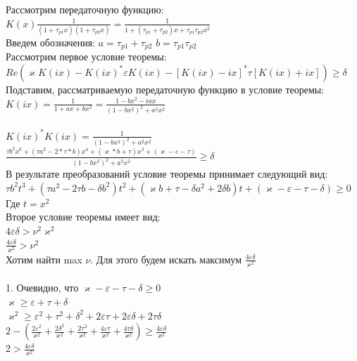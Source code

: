 \documentclass[a4paper]{article}
\begin{document}

 Рассмотрим передаточную функцию:
$K(x)\frac{1}{(1+\tau_{p1}x)(1+\tau_{p2}x)} = \frac{1}{1+(\tau_{p1}+\tau_{p2})x + \tau_{p1}\tau_{p2}x^2}$\\
Введем обозначения:
$a = \tau_{p1}+\tau_{p2}$
$b = \tau_{p1}\tau_{p2}$\\
Рассмотрим первое условие теоремы:\\
$Re(\varkappa K(ix)-K(ix)^*\varepsilon K(ix)-[K(ix)-ix]^*\tau[K(ix)+ix])\geq\delta$\\
Подставим, рассматриваемую передаточную функцию в условие теоремы:\\
$K(ix)=\frac{1}{1+ax + bx^2}=\frac{1-bx^2-iax}{(1-bx^2)^2 + a^2x^2}$\\\\
$K(ix)^*K(ix)=\frac{1}{(1-bx^2)^2 + a^2x^2}$\\
$\frac{\tau b^2x^6 + (\tau a^2-2*\tau*b)x^4 + (\varkappa*b+\tau)x^2 + (\varkappa-\varepsilon-\tau)}{(1-bx^2)^2 + a^2x^2}\geq\delta$\\
В результате преобразований условие теоремы принимает следующий вид:\\
$\tau b^2t^3 + (\tau a^2-2 \tau b - \delta b^2)t^2 + (\varkappa b+\tau-\delta a^2 + 2\delta b)t + (\varkappa-\varepsilon-\tau-\delta) \geq 0 $\\
Где $t=x^2$\\
Второе условие теоремы имеет вид: \\
$4\varepsilon\delta > \nu^2\varkappa^2$\\
$\frac{4\varepsilon\delta}{\varkappa^2} > \nu^2$\\
Хотим найти max  $\nu$. Для этого будем искать максимум $\frac{4\varepsilon\delta}{\varkappa^2}$\\\\

1. Очевидно, что  $\varkappa - \varepsilon - \tau - \delta \geq 0$\\
$\varkappa \geq \varepsilon+\tau+\delta $\\
$\varkappa^2 \geq \varepsilon^2 + \tau^2 + \delta^2 + 2\varepsilon\tau + 2\varepsilon\delta + 2\tau\delta$\\
$2 -(\frac{2\varepsilon^2}{\varkappa^2} + \frac{2\delta^2}{\varkappa^2} + \frac{2\tau^2}{\varkappa^2} +\frac{4\varepsilon\tau}{\varkappa^2} + \frac{4\tau\delta}{\varkappa^2}) \geq \frac{4\varepsilon\delta}{\varkappa^2}$\\
$2 > \frac{4\varepsilon\delta}{\varkappa^2}$\\\\
\end{document}
